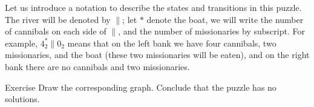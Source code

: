 Let us introduce a notation to describe the states and transitions in this puzzle.
The river will be denoted by ${\parallel}$;
let $*$ denote the boat, we will write the number of cannibals on each side of ${\parallel}$, and the number of missionaries by subscript. 
For example, $4_2^*{\parallel}0_2$ means that on the left bank we have four cannibals, two missionaries, and the boat (these two missionaries will be eaten), and on the right bank there are no cannibals and two missionaries.

\begin{thm}{Exercise}\label{ex:cannibals}
Draw the corresponding graph.
Conclude that the puzzle has no solutions.
\end{thm}


